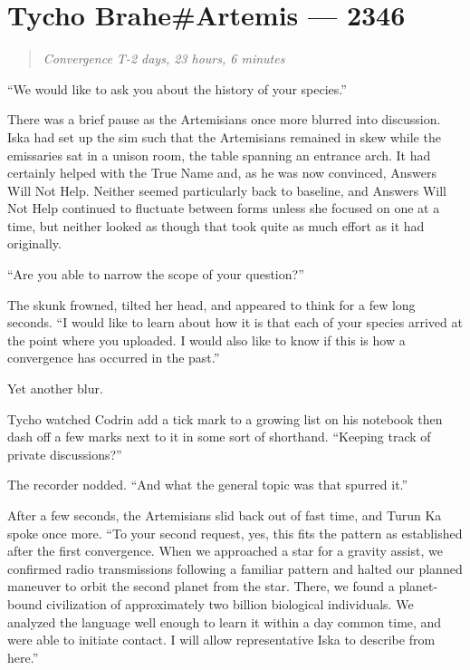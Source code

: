 \hypertarget{tycho-braheartemis-2346}{%
\chapter{Tycho Brahe\#Artemis — 2346}\label{tycho-braheartemis-2346}}

\begin{quote}
\emph{Convergence T-2 days, 23 hours, 6 minutes}
\end{quote}

``We would like to ask you about the history of your species.''

There was a brief pause as the Artemisians once more blurred into discussion. Iska had set up the sim such that the Artemisians remained in skew while the emissaries sat in a unison room, the table spanning an entrance arch. It had certainly helped with the True Name and, as he was now convinced, Answers Will Not Help. Neither seemed particularly back to baseline, and Answers Will Not Help continued to fluctuate between forms unless she focused on one at a time, but neither looked as though that took quite as much effort as it had originally.

``Are you able to narrow the scope of your question?''

The skunk frowned, tilted her head, and appeared to think for a few long seconds. ``I would like to learn about how it is that each of your species arrived at the point where you uploaded. I would also like to know if this is how a convergence has occurred in the past.''

Yet another blur.

Tycho watched Codrin add a tick mark to a growing list on his notebook then dash off a few marks next to it in some sort of shorthand. ``Keeping track of private discussions?''

The recorder nodded. ``And what the general topic was that spurred it.''

After a few seconds, the Artemisians slid back out of fast time, and Turun Ka spoke once more. ``To your second request, yes, this fits the pattern as established after the first convergence. When we approached a star for a gravity assist, we confirmed radio transmissions following a familiar pattern and halted our planned maneuver to orbit the second planet from the star. There, we found a planet-bound civilization of approximately two billion biological individuals. We analyzed the language well enough to learn it within a day common time, and were able to initiate contact. I will allow representative Iska to describe from here.''

